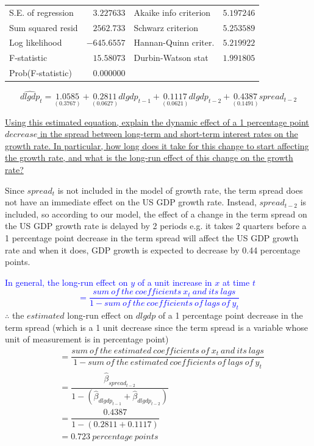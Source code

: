 \documentclass[12pt]{report}
\begin{document}
\begin{table}[H]
\begin{tabular}{lrrrr}
		\multicolumn{1}{l}{S.E. of regression}&\multicolumn{1}{r}{$3.227633$}&\multicolumn{2}{l}{Akaike info criterion}&\multicolumn{1}{r}{$5.197246$}\\
		\multicolumn{1}{l}{Sum squared resid}&\multicolumn{1}{r}{$2562.733$}&\multicolumn{2}{l}{Schwarz criterion}&\multicolumn{1}{r}{$5.253589$}\\
		\multicolumn{1}{l}{Log likelihood}&\multicolumn{1}{r}{$-645.6557$}&\multicolumn{2}{l}{Hannan-Quinn criter.}&\multicolumn{1}{r}{$5.219922$}\\
		\multicolumn{1}{l}{F-statistic}&\multicolumn{1}{r}{$15.58073$}&\multicolumn{2}{l}{Durbin-Watson stat}&\multicolumn{1}{r}{$1.991805$}\\
		\multicolumn{1}{l}{Prob(F-statistic)}&\multicolumn{1}{r}{$0.000000$}&\multicolumn{1}{c}{}&\multicolumn{1}{c}{}&\multicolumn{1}{c}{}\\
	\end{tabular}
	$$\widehat{dlgdp}_t = \underset{(0.3767)}{1.0585} + \underset{(0.0627)}{0.2811}dlgdp_{t-1} + \underset{(0.0621)}{0.1117}dlgdp_{t-2} + \underset{(0.1491)}{0.4387}spread_{t-2}$$
\end{table}
\vspace{-\baselineskip}

\noindent \uline{Using this estimated equation, explain the dynamic effect of a 1 percentage point $decrease$ in the spread between long-term and short-term interest rates on the growth rate. In particular, how long does it take for this change to start affecting the growth rate, and what is the long-run effect of this change on the growth rate?}

\noindent Since $spread_t$ is not included in the model of growth rate, the term spread does not have an immediate effect on the US GDP growth rate. Instead, $spread_{t-2}$ is included, so according to our model, the effect of a change in the term spread on the US GDP growth rate is delayed by 2 periods e.g. it takes 2 quarters before a 1 percentage point decrease in the term spread will affect the US GDP growth rate and when it does, GDP growth is expected to decrease by 0.44 percentage points.

\noindent \textcolor{blue}{In general, the long-run effect on $y$ of a unit increase in $x$ at time $t$ $$= \dfrac{sum\ of\ the\ coefficients\ x_t\ and\ its\ lags}{1 - sum\ of\ the\ coefficients\ of\ lags\ of\ y_t}$$}
\noindent $\therefore$ the $estimated$ long-run effect on $dlgdp$ of a 1 percentage point decrease in the term spread (which is a 1 unit decrease since the term spread is a variable whose unit of measurement is in percentage point) \begin{align*}
	&= \dfrac{sum\ of\ the\ estimated\ coefficients\ of\ x_t\ and\ its\ lags}{1 - sum\ of\ the\ estimated\ coefficients\ of\ lags\ of\ y_t} \\
	&= \dfrac{\hat{\beta}_{spread_{t-2}}}{1-(\hat{\beta}_{dlgdp_{t-1}} + \hat{\beta}_{dlgdp_{t-2}})} \\
	&= \dfrac{0.4387}{1 - (0.2811 + 0.1117)} \\
	&= 0.723\ percentage\ points
\end{align*} 
\end{document}
